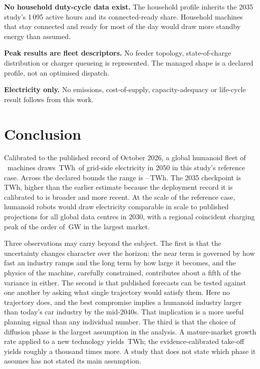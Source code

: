 \documentclass[11pt]{article}
\newcommand{\TWh}{\,TWh}
\begin{document}
\textbf{No household duty-cycle data exist.} The household profile inherits the 2035 study's 1\,095 active hours and its connected-ready share. Household machines that stay connected and ready for most of the day would draw more standby energy than assumed.

\textbf{Peak results are fleet descriptors.} No feeder topology, state-of-charge distribution or charger queueing is represented. The managed shape is a declared profile, not an optimised dispatch.

\textbf{Electricity only.} No emissions, cost-of-supply, capacity-adequacy or life-cycle result follows from this work.

\section{Conclusion}\label{sec:conclusion}
Calibrated to the published record of October 2026, a global humanoid fleet of \RefStockFifty\ machines draws \RefTWhFifty\TWh\ of grid-side electricity in 2050 in this study's reference case. Across the declared bounds the range is \MCHFiftyFive--\MCHFiftyNinetyFive\TWh. The 2035 checkpoint is \RefTWhThirtyFive\TWh, higher than the earlier estimate because the deployment record it is calibrated to is broader and more recent. At the scale of the reference case, humanoid robots would draw electricity comparable in scale to published projections for all global data centres in 2030, with a regional coincident charging peak of the order of \RefPeakCN\,GW in the largest market.

Three observations may carry beyond the subject. The first is that the uncertainty changes character over the horizon: the near term is governed by how fast an industry ramps and the long term by how large it becomes, and the physics of the machine, carefully constrained, contributes about a fifth of the variance in either. The second is that published forecasts can be tested against one another by asking what single trajectory would satisfy them. Here no trajectory does, and the best compromise implies a humanoid industry larger than today's car industry by the mid-2040s. That implication is a more useful planning signal than any individual number. The third is that the choice of diffusion phase is the largest assumption in the analysis. A mature-market growth rate applied to a new technology yields \AnaTWhFifty\TWh; the evidence-calibrated take-off yields roughly a thousand times more. A study that does not state which phase it assumes has not stated its main assumption.
\end{document}
